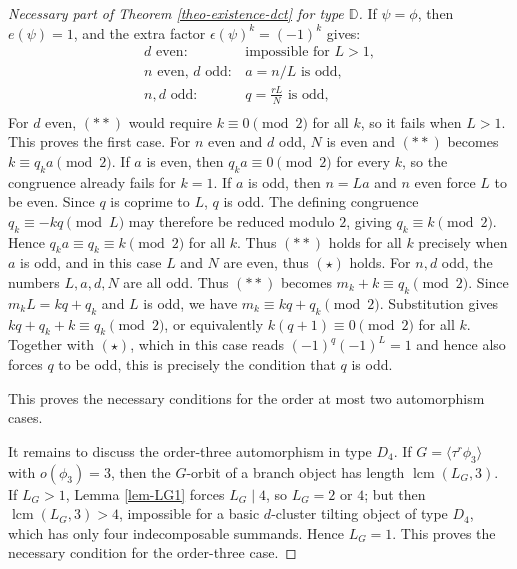 \documentclass[12pt]{article}
\theoremstyle{plain}
\theoremstyle{definition}
\begin{document}
\begin{proof}[Necessary part of Theorem \ref{theo-existence-dct} for type $\mathbb{D}$]
If \(\psi=\phi\), then $e(\psi)=1$, and the extra factor \(\epsilon(\psi)^k=(-1)^k\) gives:
\[
\begin{array}{ll}
d \text{ even}:&
\text{impossible for }L>1,\\
n \text{ even},\, d \text{ odd}:&
a=n/L\text{ is odd},\\
n,d \text{ odd}:&
\text{\(q=\frac{rL}{N}\) is odd},\\
\end{array}
\]
For $d$ even, \((**)\) would require \(k\equiv0\pmod2\) for all \(k\), so
it fails when \(L>1\). This proves the first case.  For \(n\) even and \(d\) odd, \(N\) is even and
\((**)\) becomes \(k\equiv q_ka\pmod2\). If \(a\) is even, then
\(q_ka\equiv0\pmod2\) for every \(k\), so the congruence already fails for
\(k=1\).  If \(a\) is odd, then \(n=La\) and \(n\) even force \(L\) to be
even. Since \(q\) is coprime to \(L\), \(q\) is odd. The defining congruence
\(q_k\equiv-kq\pmod L\) may therefore be reduced modulo \(2\), giving
\(q_k\equiv k\pmod2\). Hence \(q_ka\equiv q_k\equiv k\pmod2\) for all \(k\).
Thus \((**)\) holds for all \(k\) precisely when \(a\) is odd, and in this case $L$ and $N$ are even, thus $(\star)$ holds.  For \(n,d\) odd, the numbers \(L,a,d,N\) are all odd. Thus \((**)\) becomes
\(m_k+k\equiv q_k\pmod2\). Since \(m_kL=kq+q_k\) and \(L\) is odd, we have
\(m_k\equiv kq+q_k\pmod2\). Substitution gives
\(kq+q_k+k\equiv q_k\pmod2\), or equivalently
\(k(q+1)\equiv0\pmod2\) for all \(k\). Together with
\((\star)\), which in this case reads \((-1)^q(-1)^L=1\) and hence also
forces \(q\) to be odd, this is precisely the condition that \(q\) is odd.
 

This proves the necessary conditions for the order at most two automorphism
cases.

It remains to discuss the order-three automorphism in type $D_4$. If
$G=\langle\tau^r\phi_3\rangle$ with $o(\phi_3)=3$, then the $G$-orbit of a
branch object has length $\operatorname{lcm}(L_G,3)$. If $L_G>1$, Lemma
\ref{lem-LG1} forces $L_G\mid4$, so $L_G=2$ or $4$; but then
$\operatorname{lcm}(L_G,3)>4$, impossible for a basic $d$-cluster tilting
object of type $D_4$, which has only four indecomposable summands. Hence
$L_G=1$. This proves the necessary condition for the order-three case.
\end{proof}
\end{document}
